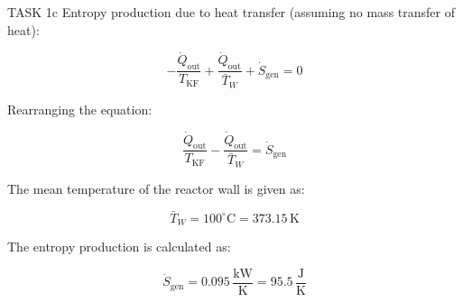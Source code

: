 TASK 1c  
Entropy production due to heat transfer (assuming no mass transfer of heat):  

\[
-\frac{\dot{Q}_{\text{out}}}{T_{\text{KF}}} + \frac{\dot{Q}_{\text{out}}}{\bar{T}_W} + \dot{S}_{\text{gen}} = 0
\]

Rearranging the equation:  

\[
\frac{\dot{Q}_{\text{out}}}{T_{\text{KF}}} - \frac{\dot{Q}_{\text{out}}}{\bar{T}_W} = \dot{S}_{\text{gen}}
\]

The mean temperature of the reactor wall is given as:  

\[
\bar{T}_W = 100^\circ\text{C} = 373.15 \, \text{K}
\]

The entropy production is calculated as:  

\[
\dot{S}_{\text{gen}} = 0.095 \, \frac{\text{kW}}{\text{K}} = 95.5 \, \frac{\text{J}}{\text{K}}
\]